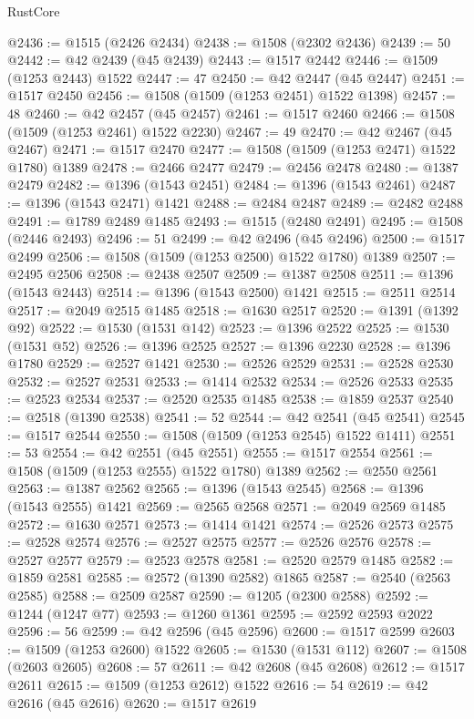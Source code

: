 \begin{lexlean}{RustCore}
\begin{coremodule}
@2436 := @1515 (@2426 @2434)
@2438 := @1508 (@2302 @2436)
@2439 := 50
@2442 := @42 @2439 (@45 @2439)
@2443 := @1517 @2442
@2446 := @1509 (@1253 @2443) @1522
@2447 := 47
@2450 := @42 @2447 (@45 @2447)
@2451 := @1517 @2450
@2456 := @1508 (@1509 (@1253 @2451) @1522 @1398)
@2457 := 48
@2460 := @42 @2457 (@45 @2457)
@2461 := @1517 @2460
@2466 := @1508 (@1509 (@1253 @2461) @1522 @2230)
@2467 := 49
@2470 := @42 @2467 (@45 @2467)
@2471 := @1517 @2470
@2477 := @1508 (@1509 (@1253 @2471) @1522 @1780) @1389
@2478 := @2466 @2477
@2479 := @2456 @2478
@2480 := @1387 @2479
@2482 := @1396 (@1543 @2451)
@2484 := @1396 (@1543 @2461)
@2487 := @1396 (@1543 @2471) @1421
@2488 := @2484 @2487
@2489 := @2482 @2488
@2491 := @1789 @2489 @1485
@2493 := @1515 (@2480 @2491)
@2495 := @1508 (@2446 @2493)
@2496 := 51
@2499 := @42 @2496 (@45 @2496)
@2500 := @1517 @2499
@2506 := @1508 (@1509 (@1253 @2500) @1522 @1780) @1389
@2507 := @2495 @2506
@2508 := @2438 @2507
@2509 := @1387 @2508
@2511 := @1396 (@1543 @2443)
@2514 := @1396 (@1543 @2500) @1421
@2515 := @2511 @2514
@2517 := @2049 @2515 @1485
@2518 := @1630 @2517
@2520 := @1391 (@1392 @92)
@2522 := @1530 (@1531 @142)
@2523 := @1396 @2522
@2525 := @1530 (@1531 @52)
@2526 := @1396 @2525
@2527 := @1396 @2230
@2528 := @1396 @1780
@2529 := @2527 @1421
@2530 := @2526 @2529
@2531 := @2528 @2530
@2532 := @2527 @2531
@2533 := @1414 @2532
@2534 := @2526 @2533
@2535 := @2523 @2534
@2537 := @2520 @2535 @1485
@2538 := @1859 @2537
@2540 := @2518 (@1390 @2538)
@2541 := 52
@2544 := @42 @2541 (@45 @2541)
@2545 := @1517 @2544
@2550 := @1508 (@1509 (@1253 @2545) @1522 @1411)
@2551 := 53
@2554 := @42 @2551 (@45 @2551)
@2555 := @1517 @2554
@2561 := @1508 (@1509 (@1253 @2555) @1522 @1780) @1389
@2562 := @2550 @2561
@2563 := @1387 @2562
@2565 := @1396 (@1543 @2545)
@2568 := @1396 (@1543 @2555) @1421
@2569 := @2565 @2568
@2571 := @2049 @2569 @1485
@2572 := @1630 @2571
@2573 := @1414 @1421
@2574 := @2526 @2573
@2575 := @2528 @2574
@2576 := @2527 @2575
@2577 := @2526 @2576
@2578 := @2527 @2577
@2579 := @2523 @2578
@2581 := @2520 @2579 @1485
@2582 := @1859 @2581
@2585 := @2572 (@1390 @2582) @1865
@2587 := @2540 (@2563 @2585)
@2588 := @2509 @2587
@2590 := @1205 (@2300 @2588)
@2592 := @1244 (@1247 @77)
@2593 := @1260 @1361
@2595 := @2592 @2593 @2022
@2596 := 56
@2599 := @42 @2596 (@45 @2596)
@2600 := @1517 @2599
@2603 := @1509 (@1253 @2600) @1522
@2605 := @1530 (@1531 @112)
@2607 := @1508 (@2603 @2605)
@2608 := 57
@2611 := @42 @2608 (@45 @2608)
@2612 := @1517 @2611
@2615 := @1509 (@1253 @2612) @1522
@2616 := 54
@2619 := @42 @2616 (@45 @2616)
@2620 := @1517 @2619

\end{coremodule}
\end{lexlean}
